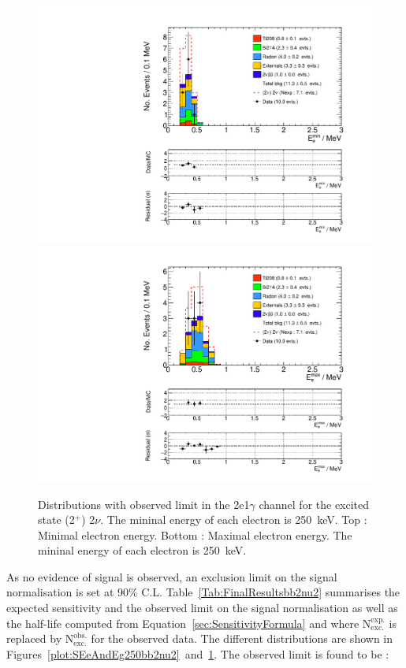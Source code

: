 \documentclass[main.tex]{subfiles}
\begin{document}
\begin{figure} [h!]
\begin{center}
\includegraphics[scale=0.5]{pictures/FinalResults/bb2nu2/250/Eemin_bb2nu2.pdf}
\includegraphics[scale=0.5]{pictures/FinalResults/bb2nu2/250/Eemax_bb2nu2.pdf}
\end{center}
\caption{Distributions with observed limit in the 2e1$\gamma$ channel for the excited state (2$^+$) 2$\nu$. The mininal energy of each electron is 250~keV. Top : Minimal electron energy. Bottom : Maximal electron energy. The mininal energy of each electron is 250~keV.}
\label{plot:EeminAndEemax250bb2nu2}
\end{figure}


\NI As no evidence of signal is observed, an exclusion limit on the signal normalisation is set at 90\% C.L. Table~\ref{Tab:FinalResultsbb2nu2} summarises the expected sensitivity and the observed limit on the signal normalisation as well as the half-life computed from Equation~\ref{sec:SensitivityFormula} and where $\text{N}_{\text{exc.}}^{\text{exp.}}$ is replaced by $\text{N}_{\text{exc.}}^{\text{obs.}}$ for the observed data. The different distributions are shown in Figures~\ref{plot:SEeAndEg250bb2nu2}~and~\ref{plot:EeminAndEemax250bb2nu2}. The observed limit is found to be :
\end{document}
